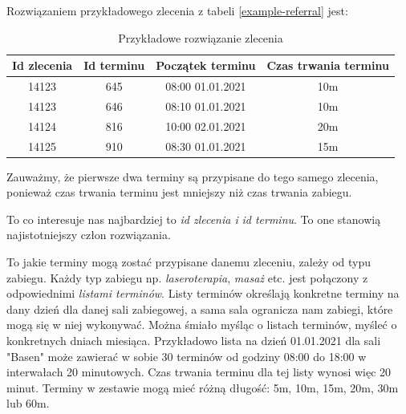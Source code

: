 Rozwiązaniem przykładowego zlecenia z tabeli \ref{example-referral}
jest:

\begin{table}[h]
	\centering
	\begin{tabular}{ | c | c | c | c | }
		\hline
	\bfseries Id zlecenia & \bfseries Id terminu & \bfseries Początek terminu & \bfseries Czas trwania terminu \\
	\hline
	14123 & 645 & 08:00 01.01.2021 & 10m \\
	\hline
	14123 & 646 & 08:10 01.01.2021 & 10m \\
	\hline
	14124 & 816 & 10:00 02.01.2021 & 20m \\
	\hline
	14125 & 910 & 08:30 01.01.2021 & 15m \\
	\hline
	\end{tabular}
	\caption{Przykładowe rozwiązanie zlecenia}
	\label{example-solution}
\end{table}

Zauważmy, że pierwsze dwa terminy są przypisane do tego samego zlecenia,
ponieważ czas trwania terminu jest mniejszy niż czas trwania zabiegu.

To co interesuje nas najbardziej to \emph{id zlecenia i} \emph{id terminu}. To
one stanowią najistotniejszy człon rozwiązania.

To jakie terminy mogą zostać przypisane danemu zleceniu,
zależy od typu zabiegu. Każdy typ zabiegu np. \emph{laseroterapia}, \emph{masaż} etc. jest
połączony z odpowiednimi \emph{listami terminów}. Listy terminów określają
konkretne terminy na dany dzień dla danej sali zabiegowej, a sama sala
ogranicza nam zabiegi, które mogą się w niej wykonywać. Można śmiało myśląc o
listach terminów, myśleć o konkretnych dniach miesiąca. Przykładowo lista na
dzień 01.01.2021 dla sali "Basen" może zawierać w sobie 30 terminów od godziny 08:00
do 18:00 w interwałach 20 minutowych. Czas trwania terminu dla tej listy wynosi
więc 20 minut. Terminy w zestawie mogą mieć różną długość: 5m, 10m, 15m, 20m, 30m
lub 60m. %
\pagebreak
